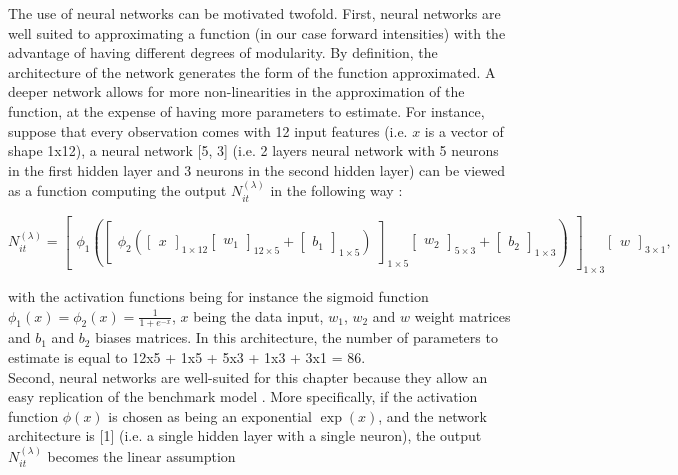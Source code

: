 The use of neural networks can be motivated twofold. First, neural networks are well suited to approximating a function (in our case forward intensities) with the advantage of having different degrees of modularity. By definition, the architecture of the network generates the form of the function approximated. A deeper network allows for more non-linearities in the approximation of the function, at the expense of having more parameters to estimate. For instance, suppose that every observation comes with 12 input features (i.e. $x$ is a vector of shape 1x12), a neural network [5, 3] (i.e. 2 layers neural network with 5 neurons in the first hidden layer and 3 neurons in the second hidden layer) can be viewed as a function computing the output $N_{it}^{(\lambda)}$ in the following way :


\begin{equation*}
N_{it}^{(\lambda)} =  \begin{bmatrix}
\phi_1 (\begin{bmatrix}
\phi_2 (\begin{bmatrix}
x
\end{bmatrix}_{1\times 12} 
\begin{bmatrix}
w_1
\end{bmatrix}_{12\times 5} + 
\begin{bmatrix}
b_1
\end{bmatrix}_{1\times 5})
\end{bmatrix}_{1 \times 5 } 
\begin{bmatrix}
w_2
\end{bmatrix}_{5 \times 3} + 
\begin{bmatrix}
b_2
\end{bmatrix}_{1 \times 3})
\end{bmatrix}_{1 \times 3} 
\begin{bmatrix}
w
\end{bmatrix}_{3 \times 1},
\end{equation*}


\noindent  with the activation functions being for instance the sigmoid function $\phi_1(x) = \phi_2(x) = \frac{1}{1+e^{-x}}$, $x$ being the data input, $w_1$, $w_2$ and $w$ weight matrices and $b_1$ and $b_2$ biases matrices. In this architecture, the number of parameters to estimate is equal to 12x5 + 1x5 + 5x3 + 1x3 + 3x1 = 86. \\
Second, neural networks are well-suited for this chapter because they allow an easy replication of the benchmark model \citet{Duan2012}. More specifically, if the activation function $\phi(x)$ is chosen as being an exponential $\exp(x)$, and the network architecture is [1] (i.e. a single hidden layer with a single neuron), the output $N_{it}^{(\lambda)}$ becomes the linear assumption

